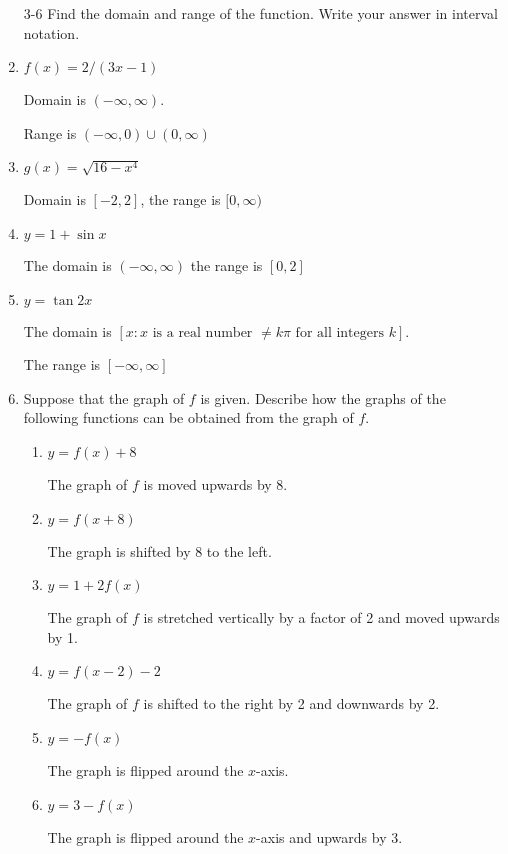 \documentclass{article}
\begin{document}
\begin{enumerate}
	\item[3-6] Find the domain and range of the function. Write your answer
		in interval notation.

	\item $f(x) = 2/(3x - 1)$

		Domain is $(-\infty , \infty)$.

		Range is $(-\infty, 0) \cup (0, \infty)$

	\item $g(x) = \sqrt{16 - x^4}$

		Domain is $[-2, 2]$, the range is $[0, \infty)$

	\item $y = 1 + \sin x$

		The domain is $(-\infty, \infty)$ the range is $[0, 2]$

	\item $y = \tan 2x$

		The domain is $[x : x \text{ is a real number } \ne k\pi \text{ for all integers } k]$.

		The range is $[-\infty, \infty]$

	\item Suppose that the graph of $f$ is given. Describe how the graphs of the 
		following functions can be obtained from the graph of $f$.

	\begin{enumerate}
		\item $y = f(x) + 8$

			The graph of $f$ is moved upwards by 8.

		\item $y = f(x + 8)$

			The graph is shifted by 8 to the left.

		\item $y = 1 + 2f(x)$

			The graph of $f$ is stretched vertically by a factor of
			2 and moved upwards by 1.

		\item $y = f(x - 2) - 2$

			The graph of $f$ is shifted to the right by 2 and 
			downwards by 2.

		\item $y = -f(x)$

			The graph is flipped around the $x$-axis.

		\item $y = 3 - f(x)$

			The graph is flipped around the $x$-axis and upwards
			by 3.


\end{enumerate}
\end{enumerate}
\end{document}

